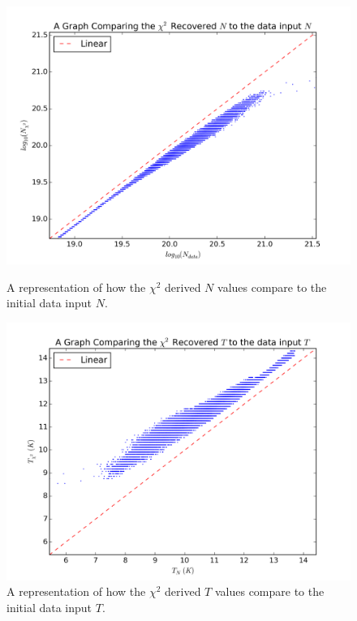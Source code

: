 \documentclass{report}
\begin{document}
\begin{figure}[H]
  \includegraphics[width=\linewidth]{../img/sph/N.png}
  \caption{A representation of how the $\chi^{2}$ derived $N$ values compare to the initial data input $N$.}\label{fig:sph_N}
\endminipage\hfill
{}
  \includegraphics[width=\linewidth]{../img/sph/T.png}
  \caption{A representation of how the $\chi^{2}$ derived $T$ values compare to the initial data input $T$.}\label{fig:sph_T}
\endminipage
\end{figure}
\end{document}
